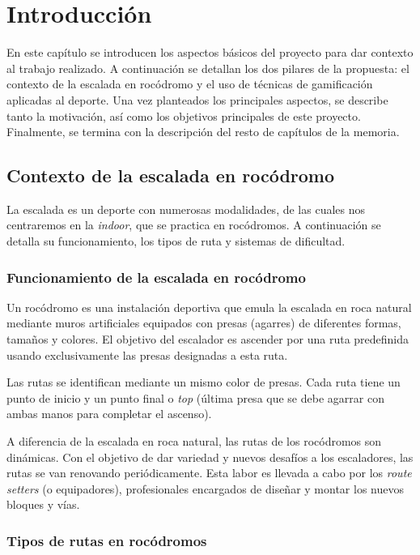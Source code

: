 \chapter{Introducción}
\label{cap:introduccion}

En este capítulo se introducen los aspectos básicos del proyecto para dar contexto al trabajo realizado. A continuación se 
detallan los dos pilares de la propuesta: el contexto de la escalada en rocódromo y el uso de técnicas de gamificación aplicadas al deporte. 
Una vez planteados los principales aspectos, se describe tanto la motivación, así como los objetivos principales de este proyecto. 
Finalmente, se termina con la descripción del resto de capítulos de la memoria.

\section{Contexto de la escalada en rocódromo}

La escalada es un deporte con numerosas modalidades, de las cuales nos centraremos en la \textit{indoor}, que se practica en rocódromos. 
A continuación se detalla su funcionamiento, los tipos de ruta y sistemas de dificultad.

\subsection{Funcionamiento de la escalada en rocódromo}

Un rocódromo es una instalación deportiva que emula la escalada en roca natural mediante muros artificiales equipados con presas (agarres) 
de diferentes formas, tamaños y colores. El objetivo del escalador es ascender por una ruta predefinida usando exclusivamente las presas 
designadas a esta ruta.

Las rutas se identifican mediante un mismo color de presas. Cada ruta tiene un punto de inicio y un punto final o \textit{top} (última 
presa que se debe agarrar con ambas manos para completar el ascenso).

A diferencia de la escalada en roca natural, las rutas de los rocódromos son dinámicas. Con el objetivo de dar variedad y nuevos desafíos a 
los escaladores, las rutas se van renovando periódicamente. Esta labor es llevada a cabo por los \textit{route setters} (o equipadores), 
profesionales encargados de diseñar y montar los nuevos bloques y vías.

\subsection{Tipos de rutas en rocódromos}

